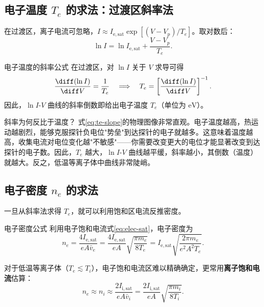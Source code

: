 \subsection{电子温度 $T_e$ 的求法：过渡区斜率法}

在过渡区，离子电流可忽略，$I \approx I_{\mathrm{e,sat}}\exp[(V - V_p)/T_e]$。取对数后：
\begin{equation}
\ln I = \ln I_{\mathrm{e,sat}} + \frac{V - V_p}{T_e}.
\end{equation}

\begin{corollary}{电子温度的斜率公式}{}{}
在过渡区，对 $\ln I$ 关于 $V$ 求导可得
\begin{equation}
\frac{\diff (\ln I)}{\diff V} = \frac{1}{T_e}
\quad\Longrightarrow\quad
T_e = \left[\frac{\diff (\ln I)}{\diff V}\right]^{-1}.
\label{eq:te-slope}
\end{equation}
因此，$\ln I$-$V$ 曲线的斜率倒数即给出电子温度 $T_e$（单位为 $\mathrm{eV}$）。
\end{corollary}

\begin{insight}{斜率为何反比于温度？}{}{}
式\eqref{eq:te-slope}的物理图像非常直观。电子温度越高，热运动越剧烈，能够克服探针负电位"势垒"到达探针的电子就越多。这意味着温度越高，收集电流对电位变化越"不敏感"——你需要改变更大的电位才能显著改变到达探针的电子数。因此，$T_e$ 越大，$\ln I$-$V$ 曲线越平缓，斜率越小，其倒数（温度）就越大。反之，低温等离子体中曲线非常陡峭。
\end{insight}

\subsection{电子密度 $n_e$ 的求法}

一旦从斜率法求得 $T_e$，就可以利用饱和区电流反推密度。

\begin{corollary}{电子密度公式}{}{}
利用电子饱和电流式\eqref{eq:elec-sat}，电子密度为
\begin{equation}
n_e = \frac{4 I_{\mathrm{e,sat}}}{e A \bar{v}_e}
= \frac{4 I_{\mathrm{e,sat}}}{e A}\sqrt{\frac{\pi m_e}{8 T_e}}
= I_{\mathrm{e,sat}} \sqrt{\frac{2\pi m_e}{e^2 A^2 T_e}}.
\label{eq:ne-from-sat}
\end{equation}

对于低温等离子体（$T_e \lesssim T_i$），电子饱和电流区难以精确确定，更常用\textbf{离子饱和电流}估算：
\begin{equation}
n_e \approx n_i \approx \frac{2 I_{\mathrm{i,sat}}}{e A \bar{v}_i}
= \frac{2 I_{\mathrm{i,sat}}}{e A}\sqrt{\frac{\pi m_i}{8 T_i}}.
\label{eq:ne-from-ion-sat}
\end{equation}
\end{corollary}

